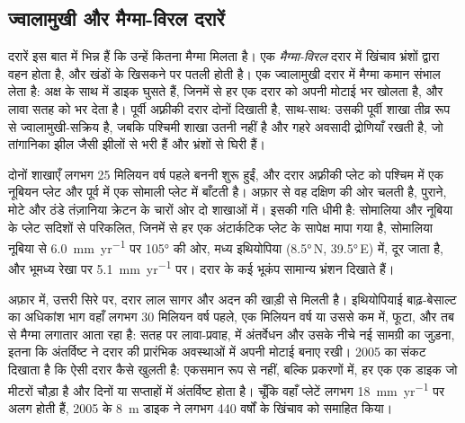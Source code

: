 \subsection*{ज्वालामुखी और मैग्मा-विरल दरारें}

दरारें इस बात में भिन्न हैं कि उन्हें कितना मैग्मा मिलता है। एक \emph{मैग्मा-विरल} दरार में खिंचाव भ्रंशों द्वारा वहन होता है, और खंडों के खिसकने पर  पतली होती है। एक ज्वालामुखी दरार में मैग्मा कमान संभाल लेता है: अक्ष के साथ  में डाइक घुसते हैं, जिनमें से हर एक दरार को अपनी मोटाई भर खोलता है, और लावा सतह को भर देता है। पूर्वी अफ़्रीकी दरार दोनों दिखाती है, साथ-साथ: उसकी पूर्वी शाखा तीव्र रूप से ज्वालामुखी-सक्रिय है, जबकि पश्चिमी शाखा उतनी नहीं है और गहरे अवसादी द्रोणियाँ रखती है, जो तांगानिका झील जैसी झीलों से भरी हैं और भ्रंशों से घिरी हैं।

दोनों शाखाएँ लगभग 25 मिलियन वर्ष पहले बननी शुरू हुईं, और दरार अफ़्रीकी प्लेट को पश्चिम में एक नूबियन प्लेट और पूर्व में एक सोमाली प्लेट में बाँटती है। अफ़ार  से वह दक्षिण की ओर चलती है, पुराने, मोटे और ठंडे तंज़ानिया क्रेटन के चारों ओर दो शाखाओं में। इसकी गति धीमी है: सोमालिया और नूबिया के प्लेट सदिशों से परिकलित, जिनमें से हर एक अंटार्कटिक प्लेट के सापेक्ष मापा गया है, सोमालिया नूबिया से \qty{6.0}{mm.yr^{-1}} पर \ang{105} की ओर, मध्य इथियोपिया (\ang{8.5}\,N, \ang{39.5}\,E) में, दूर जाता है, और भूमध्य रेखा पर \qty{5.1}{mm.yr^{-1}} पर। दरार के कई भूकंप सामान्य भ्रंशन दिखाते हैं।

अफ़ार में, उत्तरी सिरे पर, दरार लाल सागर और अदन की खाड़ी से मिलती है। इथियोपियाई बाढ़-बेसाल्ट का अधिकांश भाग वहाँ लगभग 30 मिलियन वर्ष पहले, एक मिलियन वर्ष या उससे कम में, फूटा, और तब से मैग्मा लगातार आता रहा है: सतह पर लावा-प्रवाह,  में अंतर्वेधन और उसके नीचे नई सामग्री का जुड़ना, इतना कि अंतर्विष्ट  ने दरार की प्रारंभिक अवस्थाओं में अपनी मोटाई बनाए रखी। 2005 का संकट दिखाता है कि ऐसी दरार कैसे खुलती है: एकसमान रूप से नहीं, बल्कि प्रकरणों में, हर एक एक डाइक जो मीटरों चौड़ा है और दिनों या सप्ताहों में अंतर्विष्ट होता है। चूँकि वहाँ प्लेटें लगभग \qty{18}{mm.yr^{-1}} पर अलग होती हैं, 2005 के \qty{8}{m} डाइक ने लगभग 440 वर्षों के खिंचाव को समाहित किया।


